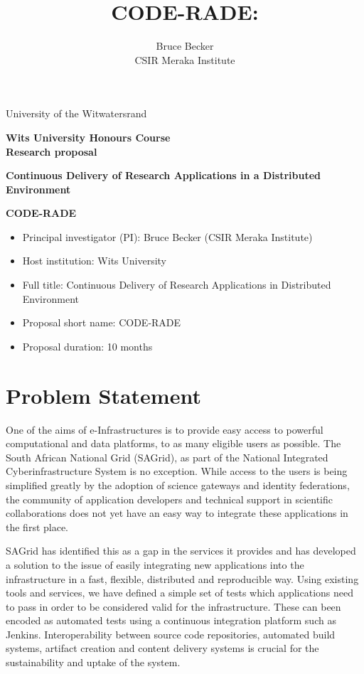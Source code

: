 \documentclass[oneside, a4paper, onecolumn, 11pt]{article}
\title{CODE-RADE:\\ }
\author{Bruce Becker\\ CSIR Meraka Institute}
\begin{document}
\noindent
University of the Witwatersrand

\vfill

\begin{center}
\large{\textbf{Wits University Honours Course\\
Research proposal }
}
\vfill

\LARGE{\textbf{Continuous Delivery of Research Applications in a Distributed Environment }}

\vfill

\LARGE{\textbf{CODE-RADE}}

\vfill

\end{center}

\vfill

\begin{itemize}
\item Principal investigator (PI): Bruce Becker (CSIR Meraka Institute)
\item Host institution: Wits University
\item Full title: Continuous Delivery of Research Applications in Distributed Environment
\item Proposal short name: CODE-RADE
\item Proposal duration: 10 months
\end{itemize}


\vfill

\noindent
\section{Problem Statement}
One of the aims of e-Infrastructures is to provide easy access to powerful computational and data platforms, to as many eligible users as possible. The South African National Grid (SAGrid), as part of the National Integrated Cyberinfrastructure System is no exception. While access to the users is being simplified greatly by the adoption of science gateways and identity federations, the community of application developers and technical support in scientific collaborations does not yet have an easy way to integrate these applications in the first place.

SAGrid has identified this as a gap in the services it provides and has developed a solution to the issue of easily integrating new applications into the infrastructure in a fast, flexible, distributed and reproducible way. Using existing tools and services, we have defined a simple set of tests which applications need to pass in order to be considered valid for the infrastructure. These can been encoded as automated tests using a continuous integration platform such as Jenkins. Interoperability between source code repositories, automated build systems, artifact creation and content delivery systems is crucial for the sustainability and uptake of the system. 
\end{document}

